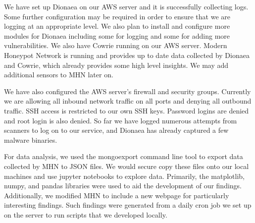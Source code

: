 We have set up Dionaea on our AWS server and it is successfully collecting logs. Some further configuration may be required in order to ensure that we are logging at an appropriate level. We also plan to install and configure more modules for Dionaea including some for logging and some for adding more vulnerabilities. We also have Cowrie running on our AWS server. Modern Honeypot Network is running and provides up to date data collected by Dionaea and Cowrie, which already provides some high level insights. We may add additional sensors to MHN later on. 

We have also configured the AWS server's firewall and security groups. Currently we are allowing all inbound network traffic on all ports and denying all outbound traffic. SSH access is restricted to our own SSH keys. Password logins are denied and root login is also denied. So far we have logged numerous attempts from scanners to log on to our service, and Dionaea has already captured a few malware binaries. 

For data analysis, we used the mongoexport command line tool to export data collected by MHN to JSON files. We would secure copy these files onto our local machines and use jupyter notebooks to explore data. Primarily, the matplotlib, numpy, and pandas libraries were used to aid the development of our findings. Additionally, we modified MHN to include a new webpage for particularly interesting findings. Such findings were generated from a daily cron job we set up on the server to run scripts that we developed locally.